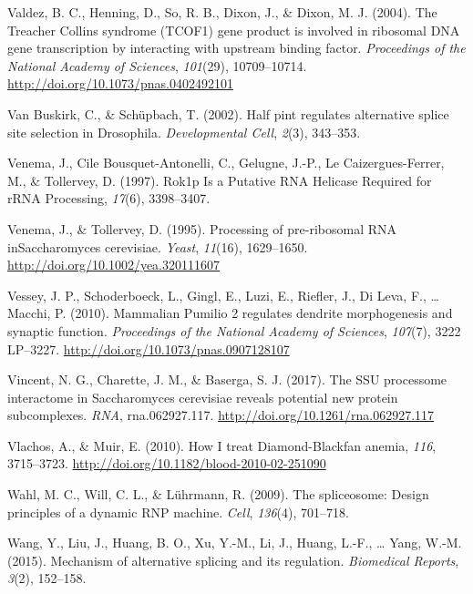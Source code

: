\documentclass[12pt,twoside]{reedthesis}
\newlength{\cslhangindent}
\newenvironment{cslreferences}%
  {\setlength{\parindent}{0pt}%
  \everypar{\setlength{\hangindent}{\cslhangindent}}\ignorespaces}%
  {\par}
\begin{document}
\begin{cslreferences}
\leavevmode\hypertarget{ref-valdezTreacherCollinsSyndrome2004}{}%
Valdez, B. C., Henning, D., So, R. B., Dixon, J., \& Dixon, M. J. (2004). The Treacher Collins syndrome (TCOF1) gene product is involved in ribosomal DNA gene transcription by interacting with upstream binding factor. \emph{Proceedings of the National Academy of Sciences}, \emph{101}(29), 10709--10714. \url{http://doi.org/10.1073/pnas.0402492101}

\leavevmode\hypertarget{ref-VanBuskirk2002}{}%
Van Buskirk, C., \& Schüpbach, T. (2002). Half pint regulates alternative splice site selection in Drosophila. \emph{Developmental Cell}, \emph{2}(3), 343--353.

\leavevmode\hypertarget{ref-Venema1997}{}%
Venema, J., Cile Bousquet-Antonelli, C., Gelugne, J.-P., Le Caizergues-Ferrer, M., \& Tollervey, D. (1997). Rok1p Is a Putative RNA Helicase Required for rRNA Processing, \emph{17}(6), 3398--3407.

\leavevmode\hypertarget{ref-venemaProcessingPreribosomalRNA1995}{}%
Venema, J., \& Tollervey, D. (1995). Processing of pre-ribosomal RNA inSaccharomyces cerevisiae. \emph{Yeast}, \emph{11}(16), 1629--1650. \url{http://doi.org/10.1002/yea.320111607}

\leavevmode\hypertarget{ref-Vessey2010b}{}%
Vessey, J. P., Schoderboeck, L., Gingl, E., Luzi, E., Riefler, J., Di Leva, F., \ldots{} Macchi, P. (2010). Mammalian Pumilio 2 regulates dendrite morphogenesis and synaptic function. \emph{Proceedings of the National Academy of Sciences}, \emph{107}(7), 3222 LP--3227. \url{http://doi.org/10.1073/pnas.0907128107}

\leavevmode\hypertarget{ref-vincentSSUProcessomeInteractome2017}{}%
Vincent, N. G., Charette, J. M., \& Baserga, S. J. (2017). The SSU processome interactome in Saccharomyces cerevisiae reveals potential new protein subcomplexes. \emph{RNA}, rna.062927.117. \url{http://doi.org/10.1261/rna.062927.117}

\leavevmode\hypertarget{ref-Vlachos2010a}{}%
Vlachos, A., \& Muir, E. (2010). How I treat Diamond-Blackfan anemia, \emph{116}, 3715--3723. \url{http://doi.org/10.1182/blood-2010-02-251090}

\leavevmode\hypertarget{ref-Wahl2009}{}%
Wahl, M. C., Will, C. L., \& Lührmann, R. (2009). The spliceosome: Design principles of a dynamic RNP machine. \emph{Cell}, \emph{136}(4), 701--718.

\leavevmode\hypertarget{ref-Wang2015a}{}%
Wang, Y., Liu, J., Huang, B. O., Xu, Y.-M., Li, J., Huang, L.-F., \ldots{} Yang, W.-M. (2015). Mechanism of alternative splicing and its regulation. \emph{Biomedical Reports}, \emph{3}(2), 152--158.


\end{cslreferences}
\end{document}

